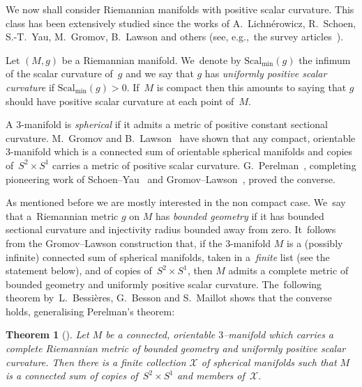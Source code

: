\documentclass[10pt,a4paper]{amsart}
\numberwithin{equation}{section}
\newtheorem{theor}{Theorem}[section]
\def\Smin{\textrm{Scal}_\mathrm{min}}
\begin{document}
We now shall consider Riemannian manifolds with positive scalar curvature. This class has been extensively studied since the works of A.~Lichn\'erowicz, R.~Schoen, S.-T.~Yau, M.~Gromov, B.~Lawson and others (see, e.g.,~the survey articles~\cite{gromov:sign,rosenberg:report}).

Let $(M,g)$ be a Riemannian manifold. We~denote by $\Smin(g)$ the infimum of the scalar curvature of~$g$ and we say that $g$ has
{\it uniformly positive scalar curvature} if $\Smin(g)>0$. If~$M$ is compact then this amounts to saying that $g$ should have positive scalar curvature at each point of~$M$.

A $3$-manifold is {\it spherical} if it admits a metric of positive constant sectional curvature. M.~Gromov and B.~Lawson~\cite{gl:spin} have shown that any compact, orientable $3$-manifold which is a connected sum of orientable spherical manifolds and copies of~$S^2\times S^1$ carries a metric of positive scalar curvature. G.~Perelman~\cite{Per2}, completing pioneering work of Schoen--Yau~\cite{SchoenYau:incompressible} and Gromov--Lawson~\cite{GromovLawson}, proved the converse.

As mentioned before we are mostly interested in the non compact case. We~say that a~Riemannian metric $g$ on $M$ has {\it bounded geometry} if it has bounded sectional curvature
and injec\-tivity radius bounded away from zero. It~follows from the Gromov--Lawson construction that, if the $3$-manifold $M$ is a (possibly infinite) connected sum of spherical manifolds, taken in a~{\it finite} list (see the statement below), and of copies of~$S^2\times S^1$, then $M$ admits
a complete metric of bounded geometry and uniformly positive scalar curvature. The~following theorem by~L.~Bessières, G.~Besson and S.~Maillot shows that the converse holds, generalising Perelman's theorem:

\begin{theor}[\cite{BBM}]\label{thm:positive scalar general}
Let $M$ be a connected, orientable $3$--manifold which carries a complete
Riemannian metric of bounded
geometry and uniformly positive scalar curvature. Then there is a finite collection $\mathcal X$ of spherical manifolds such that $M$ is a connected sum of copies of~$S^2\times S^1$ and members of~$\mathcal X$.
\end{theor}
\end{document}

